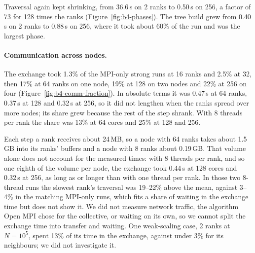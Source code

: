 \documentclass[10pt,a4paper,twocolumn,twoside]{rho-class/rho}
\begin{document}
Traversal again kept shrinking, from 36.6\,s on 2 ranks to 0.50\,s on 256, a factor of 73 for 128 times the ranks (Figure~\ref{fig:b4-phases}). The tree build grew from 0.40\,s on 2 ranks to 0.88\,s on 256, where it took about 60\% of the run and was the largest phase.

\paragraph{Communication across nodes.} The exchange took 1.3\% of the MPI-only strong runs at 16 ranks and 2.5\% at 32, then 17\% at 64 ranks on one node, 19\% at 128 on two nodes and 22\% at 256 on four (Figure~\ref{fig:b4-comm-fraction}). In absolute terms it was 0.47\,s at 64 ranks, 0.37\,s at 128 and 0.32\,s at 256, so it did not lengthen when the ranks spread over more nodes; its share grew because the rest of the step shrank. With 8 threads per rank the share was 13\% at 64 cores and 25\% at 128 and 256.

Each step a rank receives about 24\,MB, so a node with 64 ranks takes about 1.5\,GB into its ranks' buffers and a node with 8 ranks about 0.19\,GB. That volume alone does not account for the measured times: with 8 threads per rank, and so one eighth of the volume per node, the exchange took 0.44\,s at 128 cores and 0.32\,s at 256, as long as or longer than with one thread per rank. In those two 8-thread runs the slowest rank's traversal was 19--22\% above the mean, against 3--4\% in the matching MPI-only runs, which fits a share of waiting in the exchange time but does not show it. We did not measure network traffic, the algorithm Open MPI chose for the collective, or waiting on its own, so we cannot split the exchange time into transfer and waiting. One weak-scaling case, 2 ranks at $N=10^5$, spent 13\% of its time in the exchange, against under 3\% for its neighbours; we did not investigate it.

\end{document}
